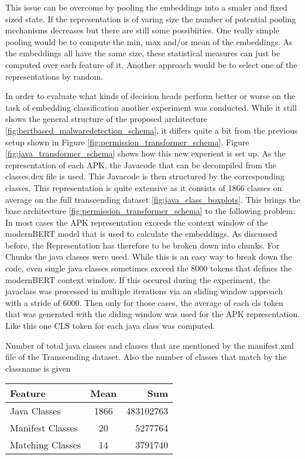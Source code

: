 This issue can be overcome by pooling the embeddings into a smaler and fixed sized
state.
If the representation is of varing size the number of potential pooling mechanisms decreases
but there are still some possibiities.
One really simple pooling would be to compute the min, max and/or mean of the embeddings.
As the embeddings all have the same size, these statistical measures can just be computed
over each feature of it.
Another approach would be to select one of the representations by random.

In order to evaluate what kinds of decision heads perform better or worse on 
the task of embedding classification another experiment was conducted.
While it still shows the general structure of the proposed architecture 
\ref{fig:bertbased_malwaredetection_schema}, it differs quite a bit from the 
previous setup shown in Figure \ref{fig:permission_transformer_schema}.
Figure \ref{fig:java_transformer_schema} shows how this new experient is set up.
As the representation of each APK, the Javacode that can be decompiled from the
classes.dex file is used. This Javacode is then structured by the corresponding
classes. This representation is quite extensive as it consists of 1866
classes on average on the full transcending dataset \ref{fig:java_class_boxplots}.
This brings the base architecture \ref{fig:permission_transformer_schema} to
the following problem: In most cases the APK representation exceeds the context
window of the modernBERT model that is used to calculate the embeddings.
As discussed before, the Representation has therefore to be broken down into chunks.
For Chunks the java classes were used. While this is an easy way to break down the code,
even single java classes sometimes exceed the 8000 tokens that defines the 
modernBERT context window. If this occured during the experiment, the javaclass was
processed in multiple iterations via an sliding window approach with a stride of 6000.
Then only for those cases, the average of each cls token that was generated with the
sliding window was used for the APK representation. 
Like this one CLS token for each java class was computed.

\begin{margintable}[-5\baselineskip]
    \caption{\label{tab:matching_java_classes_transcend} Number of total java classes and classes that are mentioned by the manifest.xml file of the Transcending dataset. Also the number of classes that match by the classname is given}
    \footnotesize
    \begin{tabular*}{\linewidth}{@{\extracolsep{\fill}} lcr@{}}
        \toprule
        \textbf{Feature} & \textbf{Mean} & \textbf{Sum} \\
        \midrule
        Java Classes & 1866 & 483102763 \\
        Manifest Classes & 20 & 5277764 \\
        Matching Classes & 14 & 3791740 \\
        \bottomrule
    \end{tabular*}
\end{margintable}


